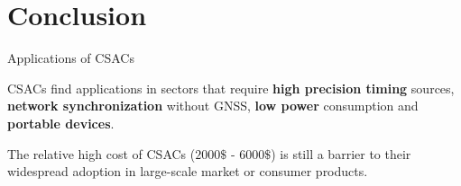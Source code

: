 \section{Conclusion}

\begin{frame}{Applications of CSACs}

    CSACs find applications in sectors that require \textbf{high precision timing} sources, \textbf{network synchronization} without GNSS, \textbf{low power} consumption and \textbf{portable devices}.

    \vspace{10pt}

    The relative high cost of CSACs ($2000\$$ - $6000\$$) is still a barrier to their widespread adoption in large-scale market or consumer products.

\end{frame}